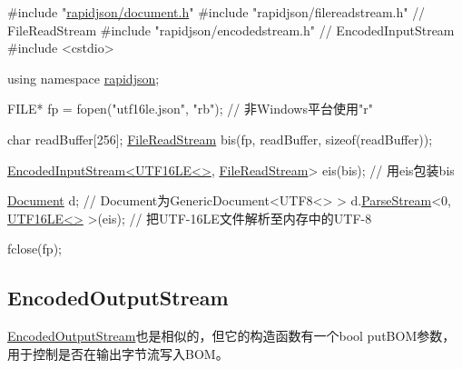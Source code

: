 \begin{DoxyCode}
\textcolor{preprocessor}{#include "\hyperlink{document_8h}{rapidjson/document.h}"}
\textcolor{preprocessor}{#include "rapidjson/filereadstream.h"}   \textcolor{comment}{// FileReadStream}
\textcolor{preprocessor}{#include "rapidjson/encodedstream.h"}    \textcolor{comment}{// EncodedInputStream}
\textcolor{preprocessor}{#include <cstdio>}

\textcolor{keyword}{using namespace }\hyperlink{namespacerapidjson}{rapidjson};

FILE* fp = fopen(\textcolor{stringliteral}{"utf16le.json"}, \textcolor{stringliteral}{"rb"}); \textcolor{comment}{// 非Windows平台使用"r"}

\textcolor{keywordtype}{char} readBuffer[256];
\hyperlink{class_file_read_stream}{FileReadStream} bis(fp, readBuffer, \textcolor{keyword}{sizeof}(readBuffer));

\hyperlink{class_encoded_input_stream}{EncodedInputStream<UTF16LE<>}, \hyperlink{class_file_read_stream}{FileReadStream}> eis(bis);  \textcolor{comment}{//
       用eis包装bis}

\hyperlink{class_generic_document}{Document} d; \textcolor{comment}{// Document为GenericDocument<UTF8<> > }
d.\hyperlink{class_generic_document_afe94c0abc83a20f2d7dc1ba7677e6238}{ParseStream}<0, \hyperlink{struct_u_t_f16_l_e}{UTF16LE<>} >(eis);  \textcolor{comment}{// 把UTF-16LE文件解析至内存中的UTF-8}

fclose(fp);
\end{DoxyCode}
\hypertarget{md_Commun_Externe_RapidJSON_doc_stream.zh-cn_EncodedOutputStream}{}\subsection{Encoded\+Output\+Stream}\label{md_Commun_Externe_RapidJSON_doc_stream.zh-cn_EncodedOutputStream}
{\ttfamily \hyperlink{class_encoded_output_stream}{Encoded\+Output\+Stream}}也是相似的，但它的构造函数有一个{\ttfamily bool put\+B\+OM}参数，用于控制是否在输出字节流写入\+B\+O\+M。


